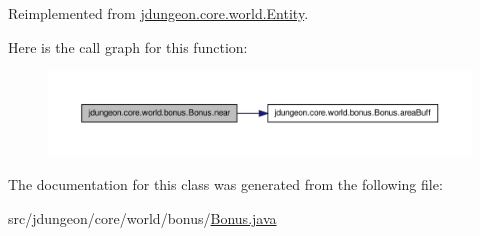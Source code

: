 Reimplemented from \hyperlink{classjdungeon_1_1core_1_1world_1_1_entity_ad2961935a2eef28553a1d65f7653280c}{jdungeon.core.world.Entity}.



Here is the call graph for this function:
\nopagebreak
\begin{figure}[H]
\begin{center}
\leavevmode
\includegraphics[width=400pt]{classjdungeon_1_1core_1_1world_1_1bonus_1_1_bonus_a08c3d899fc2086987da644d425e7edef_cgraph}
\end{center}
\end{figure}




The documentation for this class was generated from the following file:\begin{DoxyCompactItemize}
\item 
src/jdungeon/core/world/bonus/\hyperlink{_bonus_8java}{Bonus.java}\end{DoxyCompactItemize}
